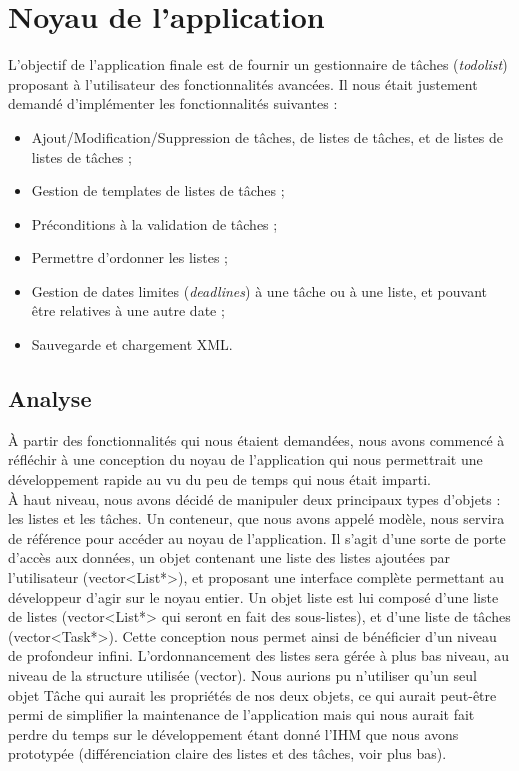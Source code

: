 \chapter{Noyau de l'application}

	L'objectif de l'application finale est de fournir un gestionnaire de tâches (\emph{todolist}) proposant à l'utilisateur des fonctionnalités avancées. Il nous était justement demandé d'implémenter les fonctionnalités suivantes :
	\begin{itemize}
		\item Ajout/Modification/Suppression de tâches, de listes de tâches, et de listes de listes de tâches ;
		\item Gestion de templates de listes de tâches ;
		\item Préconditions à la validation de tâches ;
		\item Permettre d'ordonner les listes ;
		\item Gestion de dates limites (\emph{deadlines}) à une tâche ou à une liste, et pouvant être relatives à une autre date ;
		\item Sauvegarde et chargement XML.
	\end{itemize}

	\section{Analyse}
	
		À partir des fonctionnalités qui nous étaient demandées, nous avons commencé à réfléchir à une conception du noyau de l'application qui nous permettrait une développement rapide au vu du peu de temps qui nous était imparti.\\
		
		À haut niveau, nous avons décidé de manipuler deux principaux types d'objets : les listes et les tâches. Un conteneur, que nous avons appelé modèle, nous servira de référence pour accéder au noyau de l'application. Il s'agit d'une sorte de porte d'accès aux données, un objet contenant une liste des listes ajoutées par l'utilisateur (vector<List*>), et proposant une interface complète permettant au développeur d'agir sur le noyau entier. Un objet liste est lui composé d'une liste de listes (vector<List*> qui seront en fait des sous-listes), et d'une liste de tâches (vector<Task*>). Cette conception nous permet ainsi de bénéficier d'un niveau de profondeur infini. L'ordonnancement des listes sera gérée à plus bas niveau, au niveau de la structure utilisée (vector).
		Nous aurions pu n'utiliser qu'un seul objet Tâche qui aurait les propriétés de nos deux objets, ce qui aurait peut-être permi de simplifier la maintenance de l'application mais qui nous aurait fait perdre du temps sur le développement étant donné l'IHM que nous avons prototypée (différenciation claire des listes et des tâches, voir plus bas).\\
		
